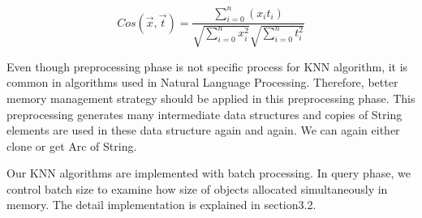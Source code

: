 \begin{equation} \label{eq:cosine}
    Cos(\vec{x}, \vec{t})
     = \frac{\sum_{i=0}^{n} (x_i t_i)}{\sqrt{\sum_{i=0}^{n} x_i^2}\sqrt{\sum_{i=0}^{n} t_i^2}}
\end{equation}

Even though preprocessing phase is not specific process for KNN algorithm, 
it is common in algorithms used in Natural Language Processing. Therefore, better memory management strategy should be applied in this preprocessing phase.
This preprocessing generates many intermediate data structures and copies of String elements are used in these data structure again and again. 
We can again either clone or get Arc of String. 

Our KNN algorithms are implemented with batch processing. In query phase, we control batch size to examine how size of objects allocated simultaneously in memory.
The detail implementation is explained in section3.2.
\clearpage
